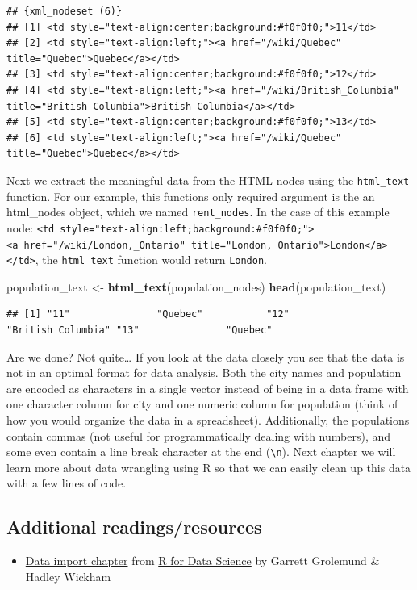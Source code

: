 \documentclass[
]{article}
\newenvironment{Shaded}{\begin{snugshade}}{\end{snugshade}}
\newcommand{\KeywordTok}[1]{\textcolor[rgb]{0.13,0.29,0.53}{\textbf{#1}}}
\newcommand{\NormalTok}[1]{#1}
\newcommand{\StringTok}[1]{\textcolor[rgb]{0.31,0.60,0.02}{#1}}
\providecommand{\tightlist}{%
  \setlength{\itemsep}{0pt}\setlength{\parskip}{0pt}}
\begin{document}
\begin{verbatim}
## {xml_nodeset (6)}
## [1] <td style="text-align:center;background:#f0f0f0;">11</td>
## [2] <td style="text-align:left;"><a href="/wiki/Quebec" title="Quebec">Quebec</a></td>
## [3] <td style="text-align:center;background:#f0f0f0;">12</td>
## [4] <td style="text-align:left;"><a href="/wiki/British_Columbia" title="British Columbia">British Columbia</a></td>
## [5] <td style="text-align:center;background:#f0f0f0;">13</td>
## [6] <td style="text-align:left;"><a href="/wiki/Quebec" title="Quebec">Quebec</a></td>
\end{verbatim}

Next we extract the meaningful data from the HTML nodes using the
\texttt{html\_text} function. For our example, this functions only
required argument is the an html\_nodes object, which we named
\texttt{rent\_nodes}. In the case of this example node:
\texttt{\textless{}td\ style="text-align:left;background:\#f0f0f0;"\textgreater{}\textless{}a\ href="/wiki/London,\_Ontario"\ title="London,\ Ontario"\textgreater{}London\textless{}/a\textgreater{}\textless{}/td\textgreater{}},
the \texttt{html\_text} function would return \texttt{London}.

\begin{Shaded}
\begin{Highlighting}[]
\NormalTok{population\_text <{-}}\StringTok{ }\KeywordTok{html\_text}\NormalTok{(population\_nodes)}
\KeywordTok{head}\NormalTok{(population\_text)}
\end{Highlighting}
\end{Shaded}

\begin{verbatim}
## [1] "11"               "Quebec"           "12"               "British Columbia" "13"               "Quebec"
\end{verbatim}

Are we done? Not quite\ldots{} If you look at the data closely you see
that the data is not in an optimal format for data analysis. Both the
city names and population are encoded as characters in a single vector
instead of being in a data frame with one character column for city and
one numeric column for population (think of how you would organize the
data in a spreadsheet). Additionally, the populations contain commas
(not useful for programmatically dealing with numbers), and some even
contain a line break character at the end (\texttt{\textbackslash{}n}).
Next chapter we will learn more about data wrangling using R so that we
can easily clean up this data with a few lines of code.

\hypertarget{additional-readingsresources}{%
\subsection{Additional
readings/resources}\label{additional-readingsresources}}

\begin{itemize}
\tightlist
\item
  \href{https://r4ds.had.co.nz/data-import.html}{Data import chapter}
  from \href{https://r4ds.had.co.nz/}{R for Data Science} by Garrett
  Grolemund \& Hadley Wickham
\end{itemize}
\end{document}
